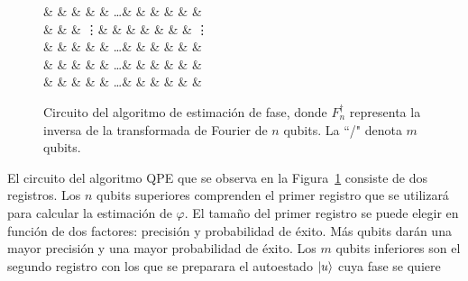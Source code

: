 \begin{figure}[ht]
\begin{Code}
\begin{center}
\begin{quantikz}[row sep=0.3cm,column sep=0.65cm]%
 &  & \qw & \qw & \qw & \dots & &  &  & \qw & \meter{} & \cw \\
\rstick{\vdots} & & & \vdots & & & & & & & \vdots \\
 &  & \qw &  & \qw & \dots & & \qw & & \qw & \meter{} & \cw \\
 &  &  &  \qw & \qw & \dots & & \qw & & \qw & \meter{} & \cw \\
 & \qw{} &  &  & \qw & \dots & &  & \qw & \qw & \qw & \qw \\
\end{quantikz}
\end{center}
\end{Code}
\caption{Circuito del algoritmo de estimación de fase, donde $F^\dagger_n$ 
representa la inversa de la transformada de Fourier de $n$ qubits. La ``/" denota $m$ qubits.}
  \label{fig:phase_estimation_circ}
\end{figure}

El circuito del algoritmo QPE que se observa en la Figura~\ref{fig:phase_estimation_circ} consiste de dos registros. Los $n$ qubits superiores comprenden el primer registro que se utilizará para calcular la estimación de $\varphi$. El tamaño del primer registro se puede elegir en función de dos factores: precisión y probabilidad de éxito. Más qubits darán una mayor precisión y una mayor probabilidad de éxito. Los $m$ qubits inferiores son el segundo registro con los que se preparara el autoestado $\ket{u} $ cuya fase se quiere

